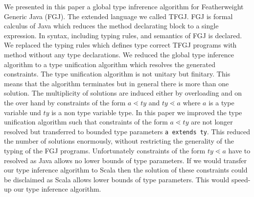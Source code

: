 We presented in this paper a global type infrerence algorithm for Featherweight
Generic Java (FGJ).  The extended language we called  TFGJ. FGJ is formal calculus of Java which reduces the method
declarating block to a single expression. In
\cite{DBLP:journals/toplas/IgarashiPW01} syntax, including typing rules, and semantics of FGJ is
declared. We replaced the typing rules which defines type correct TFGJ
programs with method without any type declarations.
We reduced the global type inference algorithm to a type unification algorithm
which resolves the generated constraints. The type unification algorithm is not
unitary but finitary. This means that the algorithm terminates but in general
there is more than one solution. The multiplicity of solutions are induced
either by overloading and on the over hand by constraints of the form $a
\lessdot ty$ and $ty \lessdot a$ where $a$ is a type variable und $ty$ is a non
type variable type. In this paper we improved the type unification algorithm
such that constraints of the form $a \lessdot ty$ are not longer resolved but
transferred to bounded type parameters \texttt{a extends ty}. This reduced the
number of solutions enormously, without restricting the generality of the typing
of the FGJ programs. Unfortunately constraints of the form $ty \lessdot a$ have
to resolved as Java allows no lower bounds of type parameters. If we would
transfer our type inference algorithm to Scala then the solution of these
constraints could be disclaimed as Scala allows lower bounds of type
parameters. This would speed-up our type inference algorithm.